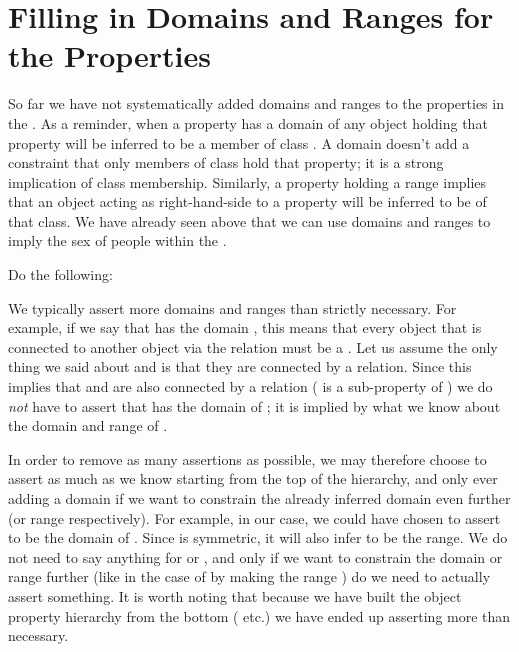 \section{Filling in Domains and Ranges for the \fhkb Properties}

So far we have not systematically added domains and ranges to the properties in the \fhkb. As a reminder, when a property has a domain of  any object holding that property will be inferred to be a member of class . A domain doesn't add a constraint that only members of class  hold that property; it is a strong implication of class membership. Similarly, a property holding a range implies that an object acting as right-hand-side to a property will be inferred to be of that class. We have already seen above that we can use domains and ranges to imply the sex of people within the \fhkb.

Do the following:


We typically assert more domains and ranges than strictly necessary. For example, if we say that  has the domain \person, this means that every object  that is connected to another object  via the  relation must be a \person. Let us assume the only thing we said about  and  is that they are connected by a  relation. Since this implies that  and  are also connected by a  relation ( is a sub-property of ) we do \emph{not} have to assert that  has the domain of \person; it is implied by what we know about the domain and range of . 

In order to remove as many assertions as possible, we may therefore choose to assert as much as we know starting from the top of the hierarchy, and only ever adding a domain if we want to constrain the already inferred domain even further (or range respectively). For example, in our case, we could have chosen to assert \person to be the domain of . Since  is symmetric, it will also infer \person to be the range. We do not need to say anything for  or , and only if we want to constrain the domain or range further (like in the case of  by making the range ) do we need to actually assert something. It is worth noting that because we have built the object property hierarchy from the bottom ( etc.) we have ended up asserting more than necessary.

